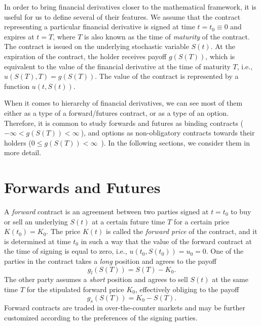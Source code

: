 \documentclass{UUThesisTemplate}
\begin{document}
\par
In order to bring financial derivatives closer to the mathematical framework, it is useful for us to define several of their features. We assume that the contract representing a particular financial derivative is signed at time $t=t_0\equiv0$ and expires at $t=T$, where $T$ is also known as the time of \emph{maturity} of the contract. The contract is issued on the underlying stochastic variable $S(t)$. At the expiration of the contract, the holder receives payoff $g(S(T))$, which is equivalent to the value of the financial derivative at the time of maturity $T$, i.e., $u(S(T),T) = g(S(T))$. The value of the contract is represented by a function $u(t,S(t))$.

\par
When it comes to hierarchy of financial derivatives, we can see most of them either as a type of a forward/futures contract, or as a type of an option. Therefore, it is common to study forwards and futures as binding contracts ($-\infty < g(S(T)) < \infty\ $), and options as non-obligatory contracts towards their holders ($0\leq g(S(T))<\infty$\ ). In the following sections, we consider them in more detail.
%





%
\section{Forwards and Futures}
\label{sec:futures}

\par
A \emph{forward} contract is an agreement between two parties signed at $t=t_0$ to buy or sell an underlying $S(t)$ at a certain future time $T$ for a certain price $K(t_0)=K_0$. The price $K(t)$ is called the \emph{forward price} of the contract, and it is determined at time $t_0$ in such a way that the value of the forward contract at the time of signing is equal to zero, i.e., $u(t_0,S(t_0))=u_0=0$. One of the parties in the contract takes a \emph{long} position and agrees to the payoff 
$$g_l(S(T))=S(T)-K_0.$$
The other party assumes a \emph{short} position and agrees to sell $S(t)$ at the same time $T$ for the stipulated forward price $K_0$, effectively obliging to the payoff 
$$g_s(S(T))=K_0-S(T).$$
Forward contracts are traded in over-the-counter markets and may be further customized according to the preferences of the signing parties.
\end{document}
